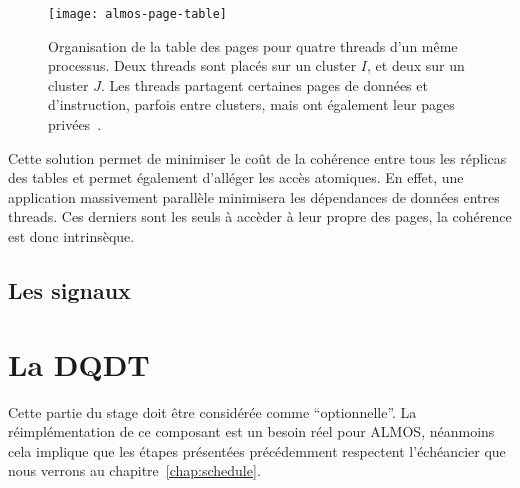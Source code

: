       \begin{figure}[ht]
        \centering
        \texttt{[image: almos-page-table]}
        \caption{Organisation de la table des pages pour quatre threads d'un
          même processus. Deux threads sont placés sur un cluster $I$, et deux
          sur un cluster $J$. Les threads partagent certaines pages de données
          et d'instruction, parfois entre clusters, mais ont également leur
          pages privées~\citep{almaless2014universite}.}
        \label{fig:almos-page-table}
      \end{figure}

      Cette solution permet de minimiser le coût de la cohérence entre tous les
      réplicas des tables et permet également d'alléger les accès atomiques. En
      effet, une application massivement parallèle minimisera les dépendances de
      données entres threads. Ces derniers sont les seuls à accèder à leur
      propre des pages, la cohérence est donc intrinsèque.


    \subsection{Les signaux}



  \section{La DQDT}
  \label{sec:dqdt}

    Cette partie du stage doit être considérée comme ``optionnelle''. La
    réimplémentation de ce composant est un besoin réel pour ALMOS, néanmoins
    cela implique que les étapes présentées précédemment respectent l'échéancier
    que nous verrons au chapitre~\ref{chap:schedule}.\\

